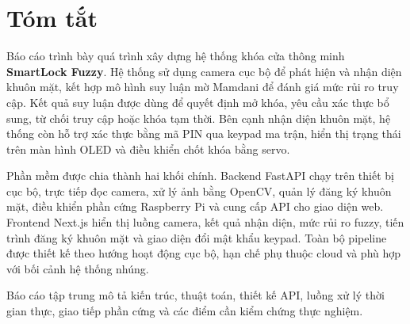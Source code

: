 \section*{Tóm tắt}

Báo cáo trình bày quá trình xây dựng hệ thống khóa cửa thông minh \textbf{SmartLock Fuzzy}. Hệ thống sử dụng camera cục bộ để phát hiện và nhận diện khuôn mặt, kết hợp mô hình suy luận mờ Mamdani để đánh giá mức rủi ro truy cập. Kết quả suy luận được dùng để quyết định mở khóa, yêu cầu xác thực bổ sung, từ chối truy cập hoặc khóa tạm thời. Bên cạnh nhận diện khuôn mặt, hệ thống còn hỗ trợ xác thực bằng mã PIN qua keypad ma trận, hiển thị trạng thái trên màn hình OLED và điều khiển chốt khóa bằng servo.

Phần mềm được chia thành hai khối chính. Backend FastAPI chạy trên thiết bị cục bộ, trực tiếp đọc camera, xử lý ảnh bằng OpenCV, quản lý đăng ký khuôn mặt, điều khiển phần cứng Raspberry Pi và cung cấp API cho giao diện web. Frontend Next.js hiển thị luồng camera, kết quả nhận diện, mức rủi ro fuzzy, tiến trình đăng ký khuôn mặt và giao diện đổi mật khẩu keypad. Toàn bộ pipeline được thiết kế theo hướng hoạt động cục bộ, hạn chế phụ thuộc cloud và phù hợp với bối cảnh hệ thống nhúng.

Báo cáo tập trung mô tả kiến trúc, thuật toán, thiết kế API, luồng xử lý thời gian thực, giao tiếp phần cứng và các điểm cần kiểm chứng thực nghiệm. 
\clearpage
